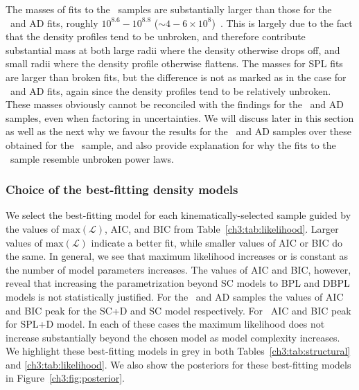 The masses of fits to the \JRLz\ samples are substantially larger than those for the \eLz\ and AD fits, roughly $10^{8.6}-10^{8.8}$ ($\sim 4-6 \times10^{8}$)~\Msun. This is largely due to the fact that the density profiles tend to be unbroken, and therefore contribute substantial mass at both large radii where the density otherwise drops off, and small radii where the density profile otherwise flattens. The masses for SPL fits are larger than broken fits, but the difference is not as marked as in the case for \eLz\ and AD fits, again since the density profiles tend to be relatively unbroken. These masses obviously cannot be reconciled with the findings for the \eLz\ and AD samples, even when factoring in uncertainties. We will discuss later in this section as well as the next why we favour the results for the \eLz\ and AD samples over these obtained for the \JRLz\ sample, and also provide explanation for why the fits to the \JRLz\ sample resemble unbroken power laws.

\subsubsection{Choice of the best-fitting density models}

We select the best-fitting model for each kinematically-selected sample guided by the values of $\mathrm{max}(\mathcal{L})$, AIC, and BIC from Table~\ref{ch3:tab:likelihood}. Larger values of $\mathrm{max}(\mathcal{L})$ indicate a better fit, while smaller values of AIC or BIC do the same. In general, we see that maximum likelihood increases or is constant as the number of model parameters increases. The values of AIC and BIC, however, reveal that increasing the parametrization beyond SC models to BPL and DBPL models is not statistically justified. For the \eLz\ and AD samples the values of AIC and BIC peak for the SC+D and SC model respectively. For \JRLz\ AIC and BIC peak for SPL+D model. In each of these cases the maximum likelihood does not increase substantially beyond the chosen model as model complexity increases. We highlight these best-fitting models in grey in both Tables~\ref{ch3:tab:structural} and \ref{ch3:tab:likelihood}. We also show the posteriors for these best-fitting models in Figure~\ref{ch3:fig:posterior}.

